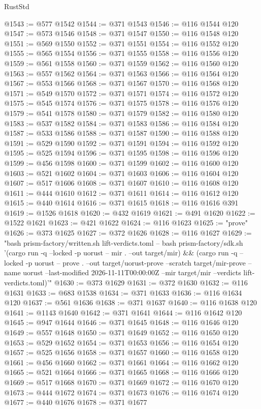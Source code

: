 \begin{lexlean}{RustStd}
\begin{coremodule}
@1543 := @577 @1542
@1544 := @371 @1543
@1546 := @116 @1544 @120
@1547 := @573 @1546
@1548 := @371 @1547
@1550 := @116 @1548 @120
@1551 := @569 @1550
@1552 := @371 @1551
@1554 := @116 @1552 @120
@1555 := @565 @1554
@1556 := @371 @1555
@1558 := @116 @1556 @120
@1559 := @561 @1558
@1560 := @371 @1559
@1562 := @116 @1560 @120
@1563 := @557 @1562
@1564 := @371 @1563
@1566 := @116 @1564 @120
@1567 := @553 @1566
@1568 := @371 @1567
@1570 := @116 @1568 @120
@1571 := @549 @1570
@1572 := @371 @1571
@1574 := @116 @1572 @120
@1575 := @545 @1574
@1576 := @371 @1575
@1578 := @116 @1576 @120
@1579 := @541 @1578
@1580 := @371 @1579
@1582 := @116 @1580 @120
@1583 := @537 @1582
@1584 := @371 @1583
@1586 := @116 @1584 @120
@1587 := @533 @1586
@1588 := @371 @1587
@1590 := @116 @1588 @120
@1591 := @529 @1590
@1592 := @371 @1591
@1594 := @116 @1592 @120
@1595 := @525 @1594
@1596 := @371 @1595
@1598 := @116 @1596 @120
@1599 := @456 @1598
@1600 := @371 @1599
@1602 := @116 @1600 @120
@1603 := @521 @1602
@1604 := @371 @1603
@1606 := @116 @1604 @120
@1607 := @517 @1606
@1608 := @371 @1607
@1610 := @116 @1608 @120
@1611 := @444 @1610
@1612 := @371 @1611
@1614 := @116 @1612 @120
@1615 := @440 @1614
@1616 := @371 @1615
@1618 := @116 @1616 @391
@1619 := @1526 @1618
@1620 := @432 @1619
@1621 := @491 @1620
@1622 := @1522 @1621
@1623 := @421 @1622
@1624 := @116 @1623
@1625 := "prove"
@1626 := @373 @1625
@1627 := @372 @1626
@1628 := @116 @1627
@1629 := "bash prism-factory/written.sh lift-verdicts.toml -- bash prism-factory/sdk.sh '(cargo run -q --locked -p uorust -- mir . --out target/mir) && (cargo run -q --locked -p uorust -- prove . --out target/uorust-prove --scratch target/mir-prove --name uorust --last-modified 2026-11-11T00:00:00Z --mir target/mir --verdicts lift-verdicts.toml)'"
@1630 := @373 @1629
@1631 := @372 @1630
@1632 := @116 @1631
@1633 := @683 @1538
@1634 := @371 @1633
@1636 := @116 @1634 @120
@1637 := @561 @1636
@1638 := @371 @1637
@1640 := @116 @1638 @120
@1641 := @1143 @1640
@1642 := @371 @1641
@1644 := @116 @1642 @120
@1645 := @947 @1644
@1646 := @371 @1645
@1648 := @116 @1646 @120
@1649 := @557 @1648
@1650 := @371 @1649
@1652 := @116 @1650 @120
@1653 := @529 @1652
@1654 := @371 @1653
@1656 := @116 @1654 @120
@1657 := @525 @1656
@1658 := @371 @1657
@1660 := @116 @1658 @120
@1661 := @456 @1660
@1662 := @371 @1661
@1664 := @116 @1662 @120
@1665 := @521 @1664
@1666 := @371 @1665
@1668 := @116 @1666 @120
@1669 := @517 @1668
@1670 := @371 @1669
@1672 := @116 @1670 @120
@1673 := @444 @1672
@1674 := @371 @1673
@1676 := @116 @1674 @120
@1677 := @440 @1676
@1678 := @371 @1677

\end{coremodule}
\end{lexlean}
